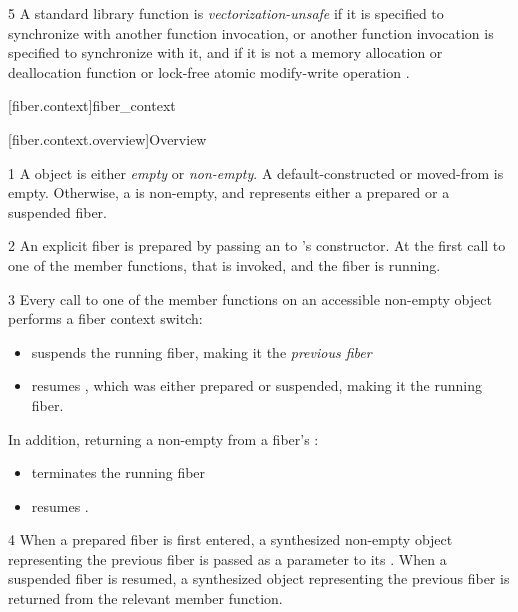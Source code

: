 
5 A standard library function is \emph{vectorization-unsafe} if it is specified to
synchronize with another function invocation, or another function invocation
is specified to synchronize with it, and if it is not a memory allocation or
deallocation function or lock-free atomic modify-write operation .
\\


\setcounter{section}{32}
\setcounter{subsection}{11}
\setcounter{secnumdepth}{4}

\cbstart

[fiber.context]{fiber\_context}

[fiber.context.overview]{Overview}

1 A \fiber object is either \emph{empty} or \emph{non-empty}. A
default-constructed or moved-from \fiber is empty. Otherwise, a \fiber is
non-empty, and represents either a prepared or a suspended fiber.

2 An explicit fiber is prepared by passing an \entryfn to \fiber's
constructor. At the first call to one of the \anyresume member functions,
that \entryfn is invoked, and the fiber is running.

3 Every call to one of the \anyresume member functions on an accessible
non-empty \fiber object performs a fiber context switch:
\begin{itemize}
    \item suspends the running fiber, making it the \emph{previous fiber}
    \item resumes \thisfiber, which was either prepared or suspended, making
          it the running fiber.
\end{itemize}
In addition, returning a non-empty \fiber from a fiber's \entryfn:
\begin{itemize}
    \item terminates the running fiber
    \item resumes .
\end{itemize}

4 When a prepared fiber is first entered, a synthesized non-empty \fiber
object representing the previous fiber is passed as a parameter to
its \entryfn. When a suspended fiber is resumed, a synthesized \fiber object
representing the previous fiber is returned from the relevant \anyresume
member function.

